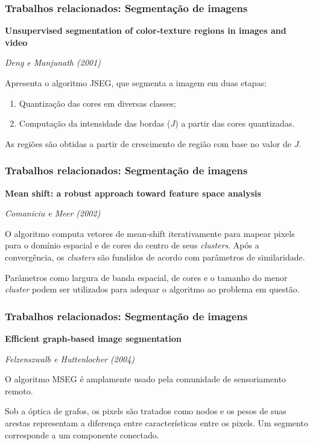 \documentclass[t]{beamer}
\begin{document}
\begin{frame}
	\frametitle{Trabalhos relacionados: Segmentação de imagens}

	\textbf{Unsupervised segmentation of color-texture regions in images and video}	

	\textit{Deng e Manjunath (2001)}

	\vspace{.5cm}

	Apresenta o algoritmo JSEG, que segmenta a imagem em duas etapas:
	\begin{enumerate}
		\item Quantização das cores em diversas classes;
		\item Computação da intensidade das bordas ($J$) a partir das cores quantizadas. 
	\end{enumerate}

	\vspace{.5cm}	

	As regiões são obtidas a partir de crescimento de região com base no valor de $J$.

\end{frame}

\begin{frame}
	\frametitle{Trabalhos relacionados: Segmentação de imagens}
	\textbf{Mean shift: a robust approach toward feature space analysis}
	
	\textit{Comaniciu e Meer (2002)}
	
	\vspace{0.5cm}
	
	O algoritmo computa vetores de mean-shift iterativamente para mapear pixels para o domínio espacial e de cores do centro de seus \textit{clusters}. Após a convergência, os \textit{clusters} são fundidos de acordo com parâmetros de similaridade. 
	
	\vspace{0.5cm}
	
	Parâmetros como largura de banda espacial, de cores e o tamanho do menor \textit{cluster} podem ser utilizados para adequar o algoritmo ao problema em questão.

	
\end{frame}

\begin{frame}
	\frametitle{Trabalhos relacionados: Segmentação de imagens}
	
	\textbf{Efficient graph-based image segmentation}
	
	\textit{Felzenszwalb e Huttenlocher (2004)}
	
	\vspace{0.5cm}
	
	O algoritmo MSEG é amplamente usado pela comunidade de sensoriamento remoto.
	
	\vspace{0.5cm}
	
	Sob a óptica de grafos, os pixels são tratados como nodos e os pesos de suas arestas representam a diferença entre características entre os pixels. Um segmento corresponde a um componente conectado.
\end{frame}
\end{document}
